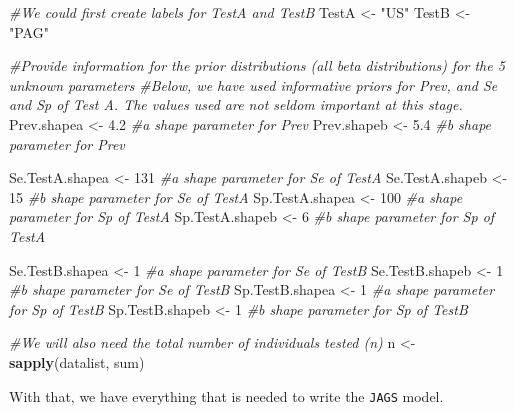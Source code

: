 \documentclass[
]{book}
\newenvironment{Shaded}{\begin{snugshade}}{\end{snugshade}}
\newcommand{\CommentTok}[1]{\textcolor[rgb]{0.56,0.35,0.01}{\textit{#1}}}
\newcommand{\DecValTok}[1]{\textcolor[rgb]{0.00,0.00,0.81}{#1}}
\newcommand{\FloatTok}[1]{\textcolor[rgb]{0.00,0.00,0.81}{#1}}
\newcommand{\FunctionTok}[1]{\textcolor[rgb]{0.13,0.29,0.53}{\textbf{#1}}}
\newcommand{\NormalTok}[1]{#1}
\newcommand{\OtherTok}[1]{\textcolor[rgb]{0.56,0.35,0.01}{#1}}
\newcommand{\StringTok}[1]{\textcolor[rgb]{0.31,0.60,0.02}{#1}}
\begin{document}
\begin{Shaded}
\begin{Highlighting}[]
\CommentTok{\#We could first create labels for TestA and TestB}
\NormalTok{TestA }\OtherTok{\textless{}{-}} \StringTok{"US"}
\NormalTok{TestB }\OtherTok{\textless{}{-}} \StringTok{"PAG"}

\CommentTok{\#Provide information for the prior distributions (all beta distributions) for the 5 unknown parameters }
\CommentTok{\#Below, we have used informative priors for Prev, and Se and Sp of Test A. The values used are not seldom important at this stage.}
\NormalTok{Prev.shapea }\OtherTok{\textless{}{-}} \FloatTok{4.2}         \CommentTok{\#a shape parameter for Prev    }
\NormalTok{Prev.shapeb }\OtherTok{\textless{}{-}} \FloatTok{5.4}         \CommentTok{\#b shape parameter for Prev}

\NormalTok{Se.TestA.shapea }\OtherTok{\textless{}{-}} \DecValTok{131}     \CommentTok{\#a shape parameter for Se of TestA}
\NormalTok{Se.TestA.shapeb }\OtherTok{\textless{}{-}} \DecValTok{15}      \CommentTok{\#b shape parameter for Se of TestA}
\NormalTok{Sp.TestA.shapea }\OtherTok{\textless{}{-}} \DecValTok{100}     \CommentTok{\#a shape parameter for Sp of TestA}
\NormalTok{Sp.TestA.shapeb }\OtherTok{\textless{}{-}} \DecValTok{6}       \CommentTok{\#b shape parameter for Sp of TestA}

\NormalTok{Se.TestB.shapea }\OtherTok{\textless{}{-}} \DecValTok{1}       \CommentTok{\#a shape parameter for Se of TestB}
\NormalTok{Se.TestB.shapeb }\OtherTok{\textless{}{-}} \DecValTok{1}       \CommentTok{\#b shape parameter for Se of TestB}
\NormalTok{Sp.TestB.shapea }\OtherTok{\textless{}{-}} \DecValTok{1}       \CommentTok{\#a shape parameter for Sp of TestB}
\NormalTok{Sp.TestB.shapeb }\OtherTok{\textless{}{-}} \DecValTok{1}       \CommentTok{\#b shape parameter for Sp of TestB}

\CommentTok{\#We will also need the total number of individuals tested (n)}
\NormalTok{n }\OtherTok{\textless{}{-}} \FunctionTok{sapply}\NormalTok{(datalist, sum)}
\end{Highlighting}
\end{Shaded}

With that, we have everything that is needed to write the \texttt{JAGS} model.
\end{document}
